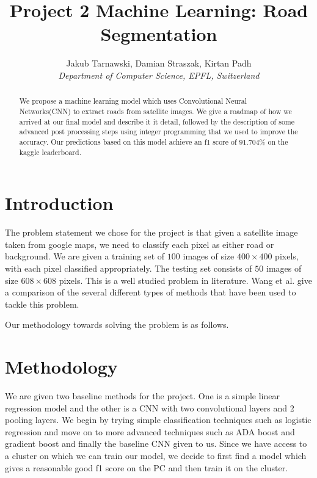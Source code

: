 \documentclass[10pt,conference,compsocconf]{IEEEtran}
\begin{document}
\title{Project 2 Machine Learning: Road Segmentation}

\author{
  Jakub Tarnawski, Damian Straszak, Kirtan Padh \\
  \textit{Department of Computer Science, EPFL, Switzerland}
}

\maketitle

\begin{abstract}
We propose a machine learning model which uses Convolutional Neural Networks(CNN) to extract roads from satellite images. We give a roadmap of how we arrived at our final model and describe it it detail, followed by the description of some advanced post processing steps using integer programming that we used to improve the accuracy. Our predictions based on this model achieve an f1 score of $91.704\%$ on the kaggle leaderboard.
\end{abstract}

\section{Introduction}
The problem statement we chose for the project is that given a satellite image taken from google maps, we need to classify each pixel as either road or background. We are given a training set of $100$ images of size $400 \times 400$ pixels, with each pixel classified appropriately. The testing set consists of $50$ images of size $608 \times 608$ pixels. This is a well studied problem in literature. Wang et al.\cite{wang16} give a comparison of the several different types of methods that have been used to tackle this problem.

Our methodology towards solving the problem is as follows.

\section{Methodology}
We are given two baseline methods for the project. One is a simple linear regression model and the other is a CNN with two convolutional layers and 2 pooling layers. We begin by trying simple classification techniques such as logistic regression and move on to more advanced techniques such as ADA boost and gradient boost and finally the baseline CNN given to us. Since we have access to a cluster on which we can train our model, we decide to first find a model which gives a reasonable good f1 score on the PC and then train it on the cluster.
\end{document}
